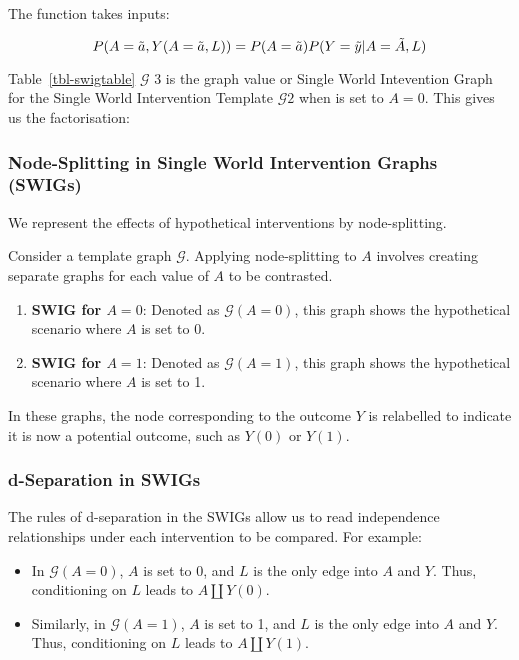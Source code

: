 \documentclass[
  single column]{article}
\providecommand{\tightlist}{%
  \setlength{\itemsep}{0pt}\setlength{\parskip}{0pt}}\usepackage{longtable,booktabs,array}
\begin{document}
The function takes inputs:

\[
P(A = \Tilde{a}, Y(A = \Tilde{a}, L))  = P(A = \Tilde{a})P(Y = \Tilde{y}|A = \Tilde{A}, L)
\]

Table~\ref{tbl-swigtable} \(\mathcal{G}\) 3 is the graph value or Single
World Intevention Graph for the Single World Intervention Template
\(\mathcal{G} 2\) when is set to \(A =0\). This gives us the
factorisation:

\subsubsection{Node-Splitting in Single World Intervention Graphs
(SWIGs)}\label{node-splitting-in-single-world-intervention-graphs-swigs}

We represent the effects of hypothetical interventions by
node-splitting.

Consider a template graph \(\mathcal{G}\). Applying node-splitting to
\(A\) involves creating separate graphs for each value of \(A\) to be
contrasted.

\begin{enumerate}
\def\labelenumi{\arabic{enumi}.}
\tightlist
\item
  \textbf{SWIG for \(A = 0\)}: Denoted as \(\mathcal{G}(A=0)\), this
  graph shows the hypothetical scenario where \(A\) is set to 0.
\item
  \textbf{SWIG for \(A = 1\)}: Denoted as \(\mathcal{G}(A=1)\), this
  graph shows the hypothetical scenario where \(A\) is set to 1.
\end{enumerate}

In these graphs, the node corresponding to the outcome \(Y\) is
relabelled to indicate it is now a potential outcome, such as \(Y(0)\)
or \(Y(1)\).

\subsubsection{d-Separation in SWIGs}\label{d-separation-in-swigs}

The rules of d-separation in the SWIGs allow us to read independence
relationships under each intervention to be compared. For example:

\begin{itemize}
\tightlist
\item
  In \(\mathcal{G}(A=0)\), \(A\) is set to 0, and \(L\) is the only edge
  into \(A\) and \(Y\). Thus, conditioning on \(L\) leads to
  \(A \coprod Y(0)\).
\item
  Similarly, in \(\mathcal{G}(A=1)\), \(A\) is set to 1, and \(L\) is
  the only edge into \(A\) and \(Y\). Thus, conditioning on \(L\) leads
  to \(A \coprod Y(1)\).
\end{itemize}
\end{document}
